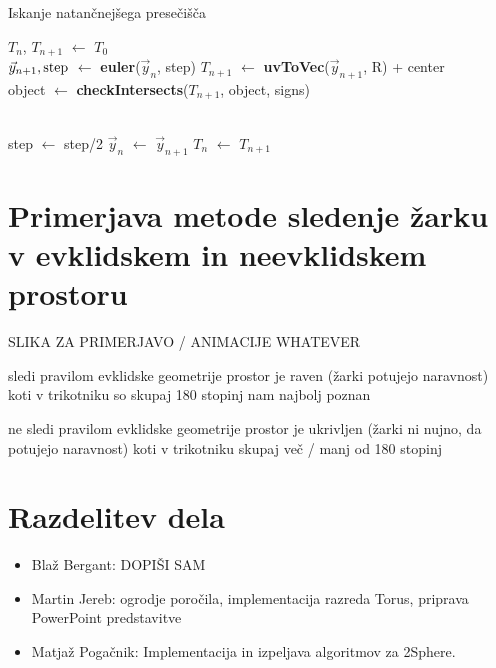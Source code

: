 \documentclass[titlepage]{article}
\begin{document}
\begin{algorithm}
    \caption{Iskanje natančnejšega presečišča}
\begin{algorithmic}

    \State $T_{n}$, $T_{n+1}$ $\gets$ $T_{0}$
    \\
      \State {}
    \EndIf
    \State $\vec{y}_{n+1}, \hbox{step}$ $\gets$ \textbf{euler}($\vec{y}_{n}$, step)
    \State $T_{n+1}$ $\gets$ \textbf{uvToVec}($\vec{y}_{n+1}$, R) + center
    \\
    \State object $\gets$ \textbf{checkIntersects}($T_{n+1}$, object, signs)
    \\
    \\

        \State step $\gets$ step/2
    \Else
      \State $\vec{y}_{n}$ $\gets$ $\vec{y}_{n+1}$
      \State $T_{n}$ $\gets$ $T_{n+1}$
    \EndIf
  \EndWhile
\EndFunction
\end{algorithmic}
\end{algorithm}

\section {Primerjava metode sledenje žarku v evklidskem in neevklidskem prostoru}

SLIKA ZA PRIMERJAVO / ANIMACIJE WHATEVER


sledi pravilom evklidske geometrije
prostor je raven (žarki potujejo naravnost)
koti v trikotniku so skupaj 180 stopinj
nam najbolj poznan

ne sledi pravilom evklidske geometrije
prostor je ukrivljen (žarki ni nujno, da potujejo naravnost)
koti v trikotniku skupaj več / manj od  180 stopinj


\section{Razdelitev dela}
\begin{itemize}
  \item Blaž Bergant: DOPIŠI SAM
  \item Martin Jereb: ogrodje poročila, implementacija razreda Torus, priprava PowerPoint predstavitve
  \item Matjaž Pogačnik: Implementacija in izpeljava algoritmov za 2Sphere.
\end{itemize}
\end{document}
